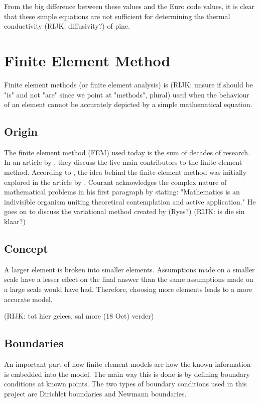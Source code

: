 From the big difference between these values and the Euro code values, it is clear that these simple equations are not sufficient for determining the thermal conductivity (RIJK: diffusivity?) of pine.



\section{Finite Element Method}\label{femsec}
Finite element methods (or finite element analysis) is (RIJK:  unsure if should be "is" and not "are" since we point at "methods", plural) used when the behaviour of an element cannot be accurately depicted by a simple mathematical equation. 
	\subsection{Origin}
	The finite element method (FEM) used today is the sum of decades of research. 
	In an article by \citeauthor{Gupta:1996}, they discuss the five main contributors to the finite element method. 
	According to \citet{Gupta:1996}, the idea behind the finite element method was initially explored in the \citeyear{Courant:1943} article by \citeauthor{Courant:1943}. 
	Courant acknowledges the complex nature of mathematical problems in his first paragraph by stating: "Mathematics is an indivisible organism uniting theoretical contemplation and active application."
	He goes on to discuss the variational method created by (Ryes?) (RIJK: is die sin klaar?)
	
	
	
	\subsection{Concept}
	A larger element is broken into smaller elements. 
	Assumptions made on a smaller scale have a lesser effect on the final answer than the same assumptions made on a large scale would have had.
	Therefore, choosing more elements leads to a more accurate model.
	
	(RIJK: tot hier gelees, sal more (18 Oct) verder)
	
	\subsection{Boundaries}
	An important part of how finite element models are how the known information is embedded into the model.
	The main way this is done is by defining boundary conditions at known points. The two types of boundary conditions used in this project are Dirichlet boundaries and Newmann boundaries.
	
